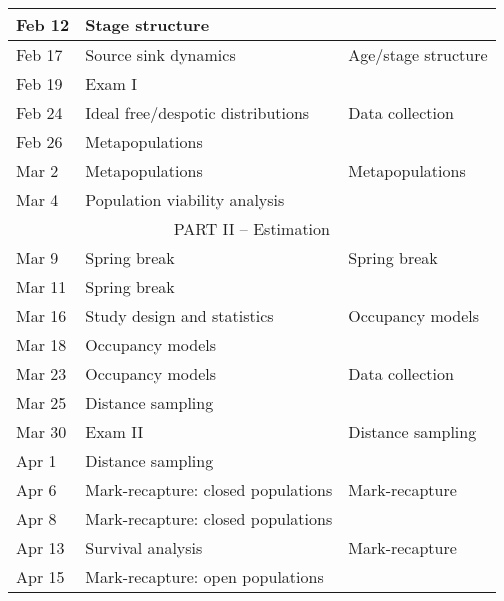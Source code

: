 \documentclass[11pt]{article}
\begin{document}
\begin{center}
\begin{tabular}[c]{lll}
Feb 12     & Stage structure                    &                                   \\
\hline
Feb 17     & Source sink dynamics               & Age/stage structure               \\
Feb 19     & Exam I                             &                                   \\
\hline
Feb 24     & Ideal free/despotic distributions  & Data collection                   \\
Feb 26     & Metapopulations                    &                                   \\
\hline
Mar 2      & Metapopulations                    & Metapopulations                   \\
Mar 4      & Population viability analysis      &                                   \\
\hline
           \multicolumn{3}{c}{PART II -- Estimation}                                \\
\hline
Mar 9     & Spring break                       & Spring break                      \\
Mar 11     & Spring break                       &                                   \\
\hline
Mar 16     & Study design and statistics        & Occupancy models                  \\
Mar 18     & Occupancy models                   &                                   \\
\hline
Mar 23     & Occupancy models                   & Data collection                   \\
Mar 25     & Distance sampling                  &                                   \\
\hline
Mar 30      & Exam II                            & Distance sampling                 \\
Apr 1      & Distance sampling                  &                                   \\
\hline
Apr 6      & Mark-recapture: closed populations & Mark-recapture                    \\
Apr 8     & Mark-recapture: closed populations &                                   \\
\hline
Apr 13     & Survival analysis                  & Mark-recapture                    \\
Apr 15     & Mark-recapture: open populations   &                                   \\

\end{tabular}
\end{center}
\end{document}
